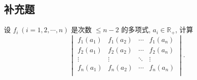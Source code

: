 \documentclass{ctexart}
\begin{document}
\subsection{补充题}
\begin{exercise}[补充题 1]
    设 $f_i\ (i=1,2,\cdots,n)$ 是次数 $\leq n-2$ 的多项式, $a_i\in\mathbb{R}_+$, 计算
    \[\begin{vmatrix}
        f_1(a_1) & f_1(a_2) & \cdots & f_1(a_n) \\
        f_2(a_1) & f_2(a_2) & \cdots & f_2(a_n) \\
        \vdots & \vdots & \ddots & \vdots \\
        f_n(a_1) & f_n(a_2) & \cdots & f_n(a_n) \\
    \end{vmatrix}.\]
\end{exercise}
\end{document}
